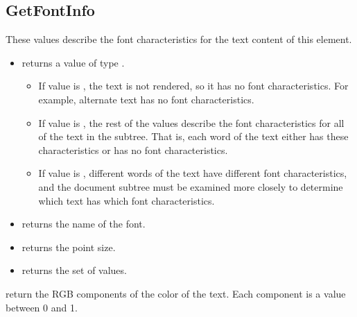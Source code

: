 \documentclass[letterpaper,12pt,english,openany,oneside]{sphinxmanual}
\begin{document}
\begin{sphinxVerbatim}[commandchars=\\\{\}]
   
\end{sphinxVerbatim}


\subsection{GetFontInfo}
\label{\detokenize{Access_DOM:getfontinfo}}
These values describe the font characteristics for the text content of this element.
\begin{itemize}
\item {} 
 returns a value of type  .
\begin{itemize}
\item {} 
If value is  , the text is not rendered, so it has no font characteristics. For example, alternate text has no font characteristics.

\item {} 
If value is  , the rest of the values describe the font characteristics for all of the text in the subtree. That is, each word of the text either has these characteristics or has no font characteristics.

\item {} 
If value is  , different words of the text have different font characteristics, and the document subtree must be examined more closely to determine which text has which font characteristics.

\end{itemize}

\item {} 
 returns the name of the font.

\item {} 
 returns the point size.

\item {} 
 returns the set of  values.

\end{itemize}

 return the RGB components of the color of the text. Each component is a value between 0 and 1.
\end{document}
